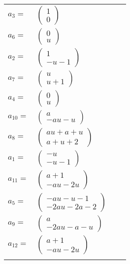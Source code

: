 \documentclass[1p]{elsarticle_modified}
\theoremstyle{definition}
\begin{document}
\begin{tabular}{m{7pt} m{180pt} m{7pt} m{180pt} }
\flushright $a_{3}=$&$\begin{pmatrix}1\\0\end{pmatrix}$ \\
\flushright $a_{6}=$&$\begin{pmatrix}0\\u\end{pmatrix}$ \\
\flushright $a_{2}=$&$\begin{pmatrix}1\\- u-1\end{pmatrix}$ \\
\flushright $a_{7}=$&$\begin{pmatrix}u\\u+1\end{pmatrix}$ \\
\flushright $a_{4}=$&$\begin{pmatrix}0\\u\end{pmatrix}$ \\
\flushright $a_{10}=$&$\begin{pmatrix}a\\- a u- u\end{pmatrix}$ \\
\flushright $a_{8}=$&$\begin{pmatrix}a u+a+u\\a+u+2\end{pmatrix}$ \\
\flushright $a_{1}=$&$\begin{pmatrix}- u\\- u-1\end{pmatrix}$ \\
\flushright $a_{11}=$&$\begin{pmatrix}a+1\\- a u-2 u\end{pmatrix}$ \\
\flushright $a_{5}=$&$\begin{pmatrix}- a u- u-1\\-2 a u-2 a-2\end{pmatrix}$ \\
\flushright $a_{9}=$&$\begin{pmatrix}a\\-2 a u- a- u\end{pmatrix}$ \\
\flushright $a_{12}=$&$\begin{pmatrix}a+1\\- a u-2 u\end{pmatrix}$\\&\end{tabular}
\end{document}
